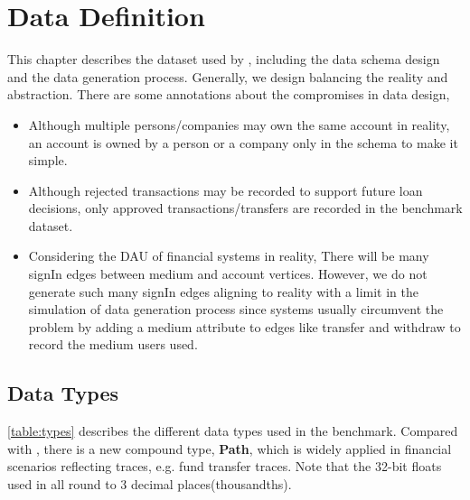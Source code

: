 \chapter{Data Definition}
\label{sec:data-definition}

This chapter describes the dataset used by \ldbcfinbench, including the data
schema design and the data generation process. Generally, we design
\ldbcfinbench balancing the reality and abstraction. There are some annotations
about the compromises in data design,
\begin{itemize}
    \item Although multiple persons/companies may own the same account in
          reality, an account is owned by a person or a company only in the
          schema to make it simple.
    \item Although rejected transactions may be recorded to support future loan
          decisions, only approved transactions/transfers are recorded in the
          benchmark dataset.
    \item Considering the DAU of financial systems in reality, There will be
          many signIn edges between medium and account vertices. However, we do
          not generate such many signIn edges aligning to reality with a limit
          in the simulation of data generation process since systems usually
          circumvent the problem by adding a medium attribute to edges like
          transfer and withdraw to record the medium users used.
\end{itemize}

\section{Data Types}

\autoref{table:types} describes the different data types used in the benchmark.
Compared with \ldbcsnb, there is a new compound type, \textbf{Path}, which is
widely applied in financial scenarios reflecting traces, e.g. fund transfer
traces. Note that the 32-bit floats used in \ldbcfinbench all round to 3 decimal
places(thousandths).

